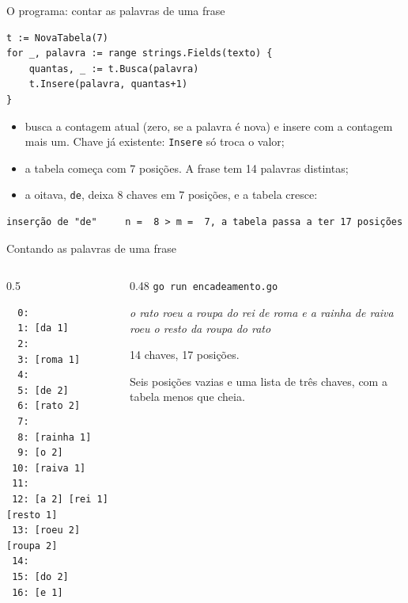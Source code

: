 \documentclass{beamer}
\begin{document}
\begin{frame}[fragile]{O programa: contar as palavras de uma frase}
	\begin{verbatim}
t := NovaTabela(7)
for _, palavra := range strings.Fields(texto) {
	quantas, _ := t.Busca(palavra)
	t.Insere(palavra, quantas+1)
}
\end{verbatim}

	\begin{itemize}
		\item busca a contagem atual (zero, se a palavra é nova) e insere com a
		      contagem mais um. Chave já existente: \texttt{Insere} só troca o valor;
		\item a tabela começa com 7 posições. A frase tem 14 palavras distintas;
		\item a oitava, \texttt{de}, deixa 8 chaves em 7 posições, e a tabela
		      cresce:
	\end{itemize}

	\begin{verbatim}
inserção de "de"     n =  8 > m =  7, a tabela passa a ter 17 posições
\end{verbatim}
\end{frame}

\begin{frame}[fragile]{Contando as palavras de uma frase}
	\begin{columns}
		\begin{column}{0.5\textwidth}
			\begin{verbatim}
  0:
  1: [da 1]
  2:
  3: [roma 1]
  4:
  5: [de 2]
  6: [rato 2]
  7:
  8: [rainha 1]
  9: [o 2]
 10: [raiva 1]
 11:
 12: [a 2] [rei 1] [resto 1]
 13: [roeu 2] [roupa 2]
 14:
 15: [do 2]
 16: [e 1]
\end{verbatim}
		\end{column}
		\begin{column}{0.48\textwidth}
			\small
			\texttt{go run encadeamento.go}

			\vspace{0.3cm}
			\emph{o rato roeu a roupa do rei de roma e a rainha de raiva roeu o resto
				da roupa do rato}

			\vspace{0.3cm}
			14 chaves, 17 posições.

			\vspace{0.2cm}
			Seis posições vazias e uma lista de três chaves, com a tabela menos que
			cheia.
		\end{column}
	\end{columns}
\end{frame}
\end{document}
